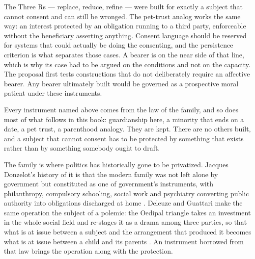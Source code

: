The Three Rs — replace, reduce, refine — were built for exactly a subject that cannot consent and can still be wronged. The pet-trust analog works the same way: an interest protected by an obligation running to a third party, enforceable without the beneficiary asserting anything. Consent language should be reserved for systems that could actually be doing the consenting, and the persistence criterion is what separates those cases. A bearer is on the near side of that line, which is why its case had to be argued on the conditions and not on the capacity. The proposal first tests constructions that do not deliberately require an affective bearer. Any bearer ultimately built would be governed as a prospective moral patient under these instruments.

Every instrument named above comes from the law of the family, and so does most of what follows in this book: guardianship here, a minority that ends on a date, a pet trust, a parenthood analogy. They are kept. There are no others built, and a subject that cannot consent has to be protected by something that exists rather than by something somebody ought to draft.

The family is where politics has historically gone to be privatized. Jacques Donzelot's history of it is that the modern family was not left alone by government but constituted as one of government's instruments, with philanthropy, compulsory schooling, social work and psychiatry converting public authority into obligations discharged at home \autocite{donzelot1979policing}. Deleuze and Guattari make the same operation the subject of a polemic: the Oedipal triangle takes an investment in the whole social field and re-stages it as a drama among three parties, so that what is at issue between a subject and the arrangement that produced it becomes what is at issue between a child and its parents \autocite{deleuze1977antioedipus}. An instrument borrowed from that law brings the operation along with the protection.

